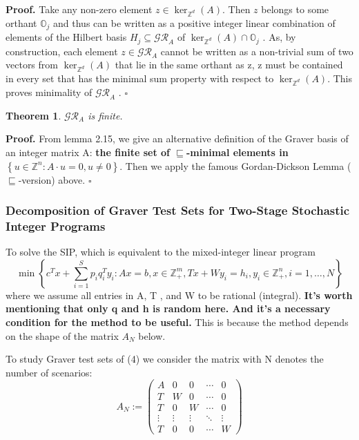 \documentclass{article}
\theoremstyle{plain}
\newtheorem{theorem}{Theorem}[section]
\theoremstyle{definition}
\begin{document}
\noindent\textbf{Proof.} Take any non-zero element  $z \in \operatorname{ker}_{\mathbb{Z}^{d}}(A) $. Then  $z$  belongs to some orthant  $\mathbb{O}_{j}$  and thus can be written as a positive integer linear combination of elements of the Hilbert basis  $H_{j} \subseteq \mathcal{GR}_{A}$  of  $\operatorname{ker}_{\mathbb{Z}^{d}}(A) \cap \mathbb{O}_{j}$ . As, by construction, each element  $z \in \mathcal{GR}_{A}$  cannot be written as a non-trivial sum of two vectors from  $\operatorname{ker}_{\mathbb{Z}^{d}}(A)$  that lie in the same orthant as  z, z  must be contained in every set that has the minimal sum property with respect to  $\operatorname{ker}_{\mathbb{Z}^{d}}(A)$. This proves minimality of  $\mathcal{GR}_{A}$ . \hfill$\square$

\begin{theorem} $\mathcal{G} \mathcal{R}_{A}$  is finite. 
\end{theorem}

\noindent\textbf{Proof.} From lemma 2.15, we give an alternative definition of the Graver basis of an integer matrix  A: \textbf{the finite set  of  $\sqsubseteq$-minimal elements in  $\left\{u \in \mathbb{Z}^{n}: A \cdot u=0,u\neq 0\right\}$}. Then we apply the famous Gordan-Dickson Lemma ($\sqsubseteq$-version) above. \hfill $\square$\\

\subsubsection{Decomposition of Graver Test Sets for Two-Stage Stochastic
Integer Programs}

To solve the SIP, which is equivalent to the mixed-integer linear program
\begin{equation}
\min \left\{c^{T} x+\sum_{i=1}^{S} p_{i} q_{i}^{T} y_{i}: A x= b, x \in \mathbb{Z}_{+}^{m}, T x+W y_{i}=h_{i}, y_{i} \in \mathbb{Z}_{+}^{n}, i=1, \ldots, N\right\}
\end{equation}where we assume all entries in  A, T , and  W  to be rational (integral). \textbf{It's worth mentioning that only q and h is random here. And it's a necessary condition for the method to be useful.  } This is because the method depends on the shape of the matrix $A_N$ below.

To study Graver test sets of (4) we consider the matrix with N denotes the number of scenarios:
$$
A_{N}:=\left(\begin{array}{ccccc}
A & 0 & 0 & \cdots & 0 \\
T & W & 0 & \cdots & 0 \\
T & 0 & W & \cdots & 0 \\
\vdots & \vdots & \vdots & \ddots & \vdots \\
T & 0 & 0 & \cdots & W
\end{array}\right)
$$
\end{document}
